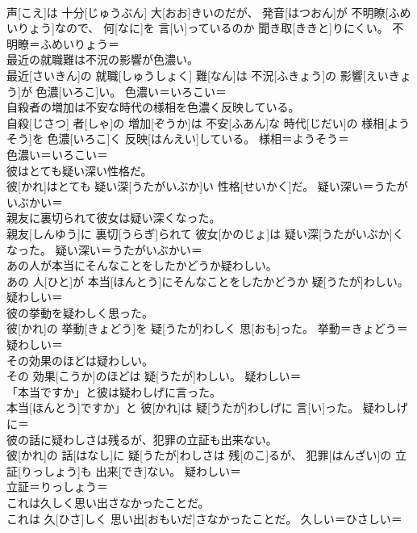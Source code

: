 \documentclass[8pt]{extreport}
\begin{document}
\begin{CJK}{UTF8}{min}
\\	声[こえ]は 十分[じゅうぶん] 大[おお]きいのだが、 発音[はつおん]が 不明瞭[ふめいりょう]なので、 何[なに]を 言[い]っているのか 聞き取[ききと]りにくい。	不明瞭＝ふめいりょう＝ 
\\	最近の就職難は不況の影響が色濃い。	
\\	最近[さいきん]の 就職[しゅうしょく] 難[なん]は 不況[ふきょう]の 影響[えいきょう]が 色濃[いろこ]い。	色濃い＝いろこい＝ 
\\	自殺者の増加は不安な時代の様相を色濃く反映している。	
\\	自殺[じさつ] 者[しゃ]の 増加[ぞうか]は 不安[ふあん]な 時代[じだい]の 様相[ようそう]を 色濃[いろこ]く 反映[はんえい]している。	様相＝ようそう＝ 
\\	色濃い＝いろこい＝ 
\\	彼はとても疑い深い性格だ。	
\\	彼[かれ]はとても 疑い深[うたがいぶか]い 性格[せいかく]だ。	疑い深い＝うたがいぶかい＝ 
\\	親友に裏切られて彼女は疑い深くなった。	
\\	親友[しんゆう]に 裏切[うらぎ]られて 彼女[かのじょ]は 疑い深[うたがいぶか]くなった。	疑い深い＝うたがいぶかい＝ 
\\	あの人が本当にそんなことをしたかどうか疑わしい。	
\\	あの 人[ひと]が 本当[ほんとう]にそんなことをしたかどうか 疑[うたが]わしい。	疑わしい＝ 
\\	彼の挙動を疑わしく思った。	
\\	彼[かれ]の 挙動[きょどう]を 疑[うたが]わしく 思[おも]った。	挙動＝きょどう＝ 
\\	疑わしい＝ 
\\	その効果のほどは疑わしい。	
\\	その 効果[こうか]のほどは 疑[うたが]わしい。	疑わしい＝ 
\\	「本当ですか」と彼は疑わしげに言った。	
\\	本当[ほんとう]ですか」と 彼[かれ]は 疑[うたが]わしげに 言[い]った。	疑わしげに＝ 
\\	彼の話に疑わしさは残るが、犯罪の立証も出来ない。	
\\	彼[かれ]の 話[はなし]に 疑[うたが]わしさは 残[のこ]るが、 犯罪[はんざい]の 立証[りっしょう]も 出来[でき]ない。	疑わしい＝ 
\\	立証＝りっしょう＝ 
\\	これは久しく思い出さなかったことだ。	
\\	これは 久[ひさ]しく 思い出[おもいだ]さなかったことだ。	久しい＝ひさしい＝ 

\end{CJK}
\end{document}
